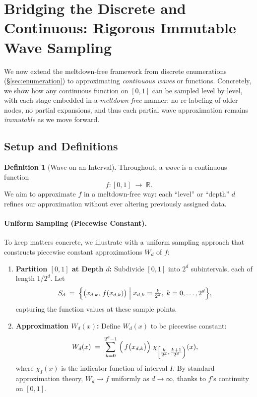 \documentclass[11pt]{article}
\theoremstyle{definition}
\newtheorem{definition}[theorem]{Definition}
\theoremstyle{remark}
\begin{document}
 \section{Bridging the Discrete and Continuous: Rigorous Immutable Wave Sampling}
\label{sec:immutable-wave-sampling}

We now extend the meltdown-free framework from discrete enumerations
(\S\ref{sec:enumeration}) to approximating \emph{continuous waves} or functions.
Concretely, we show how any continuous function on $[0,1]$ can be sampled
level by level, with each stage embedded in a \emph{meltdown-free} manner:
no re-labeling of older nodes, no partial expansions, and thus each partial
wave approximation remains \emph{immutable} as we move forward.

\subsection{Setup and Definitions}
\label{subsec:wave-setup}

\begin{definition}[Wave on an Interval]
  \label{def:wave}
  Throughout, a \emph{wave} is a continuous function
  \[
    f : [0,1] \;\to\; \mathbb{R}.
  \]
  We aim to approximate $f$ in a meltdown-free way: each ``level'' or ``depth''
  $d$ refines our approximation without ever altering previously assigned data.
\end{definition}

\paragraph{Uniform Sampling (Piecewise Constant).}
To keep matters concrete, we illustrate with a uniform sampling approach
that constructs piecewise constant approximations $W_d$ of $f$:
\begin{enumerate}
  \item \textbf{Partition $[0,1]$ at Depth $d$:}  
    Subdivide $[0,1]$ into $2^d$ subintervals, each of length $1/2^d$. Let
    \[
      S_d \;=\; \Bigl\{\bigl(x_{d,k},\,f(x_{d,k})\bigr)\;\Big|\;
        x_{d,k} = \tfrac{k}{2^d},\; k=0,\dots,2^d
      \Bigr\},
    \]
    capturing the function values at these sample points.
  \item \textbf{Approximation $W_d(x)$:}  
    Define $W_d(x)$ to be piecewise constant:
    \[
      W_d(x) \;=\; \sum_{k=0}^{2^d-1} \;
      \Bigl(\,
        f\bigl(x_{d,k}\bigr)
      \Bigr)\;
      \chi_{\left[\tfrac{k}{2^d},\,\tfrac{k+1}{2^d}\right)}(x),
    \]
    where $\chi_I(x)$ is the indicator function of interval $I$. By standard
    approximation theory, $W_d \to f$ uniformly as $d\to\infty$, thanks to $f$'s
    continuity on $[0,1]$.
\end{enumerate}
\end{document}
